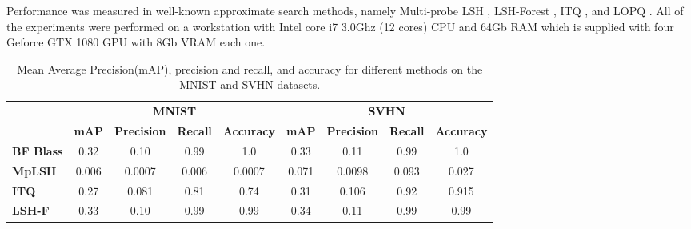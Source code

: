 \documentclass{article}
\begin{document}
            	
Performance was measured in well-known approximate search methods, namely  Multi-probe LSH \cite{multiprobe}, LSH-Forest \cite{lshforest}, ITQ \cite{itq}, and LOPQ \cite{lopq}. All of the experiments were performed on a workstation with Intel core i7  3.0Ghz (12 cores) CPU and 64Gb RAM which is supplied with four Geforce GTX 1080 GPU with 8Gb VRAM each one.
            	
            	
\begin{table}[ht]
\caption{Mean Average Precision(mAP), precision and recall, and accuracy for different methods on the MNIST and  SVHN  datasets. }
\label{table:map}
\centering
\begin{footnotesize}
\begin{tabular}{l|c|c|c|c|c|c|c|c|}
\cline{2-9}
    & \multicolumn{4}{c|}{\textbf{MNIST}}             & \multicolumn{4}{c|}{\textbf{SVHN}}         \\ \cline{2-9} 
    & \textbf{mAP} & \textbf{Precision} & \textbf{Recall} & \textbf{Accuracy} & \textbf{mAP} & \textbf{Precision} & \textbf{Recall} & \textbf{Accuracy}  \\ \hline
\multicolumn{1}{|l|}{\textbf{BF Blass  \cite{multiprobe}}}       & 0.32         & 0.10            & 0.99    & 1.0      & 0.33         & 0.11            & 0.99  & 1.0     \\ \hline
\multicolumn{1}{|l|}{\textbf{MpLSH \cite{multiprobe}}}         &  0.006         & 0.0007            & 0.006    & 0.0007   & 0.071        & 0.0098            & 0.093   & 0.027    \\ \hline
\multicolumn{1}{|l|}{\textbf{ITQ \cite{itq}}}        & 0.27         & 0.081            & 0.81    & 0.74    & 0.31         & 0.106            & 0.92   & 0.915      \\ \hline
\multicolumn{1}{|l|}{\textbf{LSH-F \cite{lshforest}}}       &  0.33         & 0.10            & 0.99 & 0.99       & 0.34         & 0.11            & 0.99    & 0.99    \\ \hline
\end{tabular}
\end{footnotesize}
\end{table}
\end{document}
